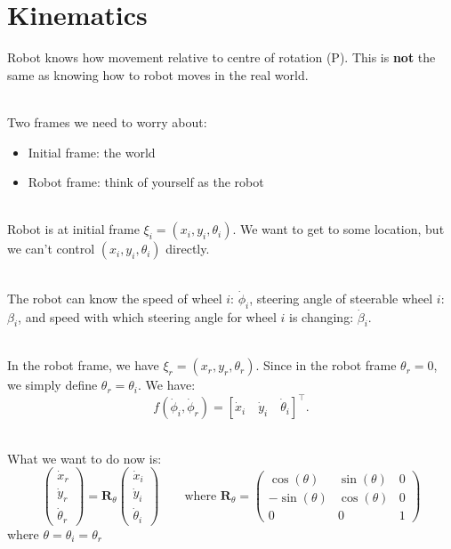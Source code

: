 \documentclass[13pt]{article}
\begin{document}
\section{Kinematics}%
\noindent
Robot knows how movement relative to centre of rotation (P). This is \textbf{not} the same as knowing how to robot moves
in the real world.

\hfill \\
\noindent
Two frames we need to worry about:
\begin{itemize}
	\item Initial frame: the world
	\item Robot frame: think of yourself as the robot
\end{itemize}

\hfill \\
\noindent
Robot is at initial frame $\xi_{i} = (x_{i}, y_{i}, \theta_{i})$. We want to get to some location, but we can't control $(x_i,
y_{i}, \theta_{i})$ directly.

\hfill \\
\noindent
The robot can know the speed of wheel $i$: $\dot \phi_{i}$, steering angle of steerable wheel $i$: $\beta_{i}$, and
speed with which steering angle for wheel $i$ is changing: $\dot \beta_{i}$.

\hfill \\
\noindent
In the robot frame, we have $\xi_{r} = (x_{r}, y_{r}, \theta_{r})$. Since in the robot frame $\theta_{r} = 0$, we simply
define $\theta_{r} = \theta_{i}$. We have: \[
	f(\dot \phi_{i}, \dot \phi_{r}) = [\dot x_{i} \quad \dot y_{i} \quad \dot \theta_{i} ]^{\top}
.\]

\hfill \\
\noindent
What we want to do now is:
\begin{equation}
	\begin{pmatrix} \dot x_{r} \\ \dot y_{r} \\ \dot \theta_{r} \end{pmatrix} =
	\bm{R}_{\theta} \begin{pmatrix} \dot x_{i} \\ \dot y_{i} \\ \dot \theta_{i} \end{pmatrix} \qquad
	\text{where }
	\bm{R}_{\theta} = \begin{pmatrix} \cos(\theta) & \sin(\theta) & 0 \\ - \sin(\theta) & \cos(\theta) & 0 \\ 0 & 0 & 1 \end{pmatrix}
\end{equation}
where $\theta = \theta_{i} = \theta_{r}$
\end{document}

